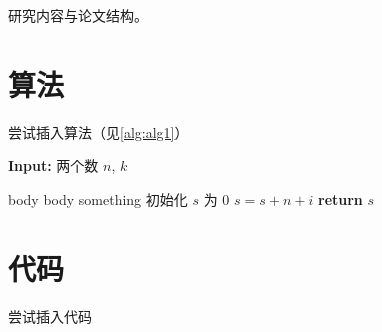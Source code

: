 \documentclass[twoside,a4paper,12pt]{book}%
\renewcommand{\COMMENT}[2][.5\linewidth]{%
  \leavevmode\hfill\makebox[#1][l]{//~#2}}
\begin{document}
研究内容\cite{erdHos1960evolution,konect:socialcomputing,konect}与论文结构\cite{Harrison1993,xiuwu2002,Erickson2003,Auroux2002}。

\chapter{算法}
尝试插入算法（见\autoref{alg:alg1}）

\begin{algorithm}[h]
    \textbf{Input:} 两个数 $n$, $k$
    \begin{algorithmic}[1]
            \State body
        \EndProcedure
            \State body
            \State \Return something
        \EndFunction
        \Statex
        \State 初始化 $s$ 为 $0$ \label{algline:init}
            \COMMENT{\textbf{循环}}
        \label{algline:for} 
                \State $s = s + n + i$
            \EndIf 
        \EndFor \label{algline:endfor}
        \State \textbf{return} $s$ \label{algline:return} 
    \end{algorithmic}
    \caption{sum($n$, $k$)}
    \label{alg:alg1}
\end{algorithm}

\chapter{代码}
尝试插入代码
\end{document}
